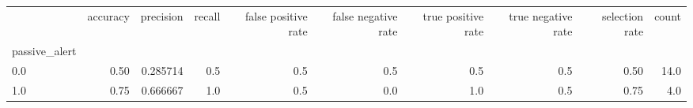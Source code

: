 \begin{tabular}{lrrrrrrrrr}
\toprule
{} &  accuracy &  precision &  recall &  false positive rate &  false negative rate &  true positive rate &  true negative rate &  selection rate &  count \\
passive\_alert &           &            &         &                      &                      &                     &                     &                 &        \\
\midrule
0.0           &      0.50 &   0.285714 &     0.5 &                  0.5 &                  0.5 &                 0.5 &                 0.5 &            0.50 &   14.0 \\
1.0           &      0.75 &   0.666667 &     1.0 &                  0.5 &                  0.0 &                 1.0 &                 0.5 &            0.75 &    4.0 \\
\bottomrule
\end{tabular}
